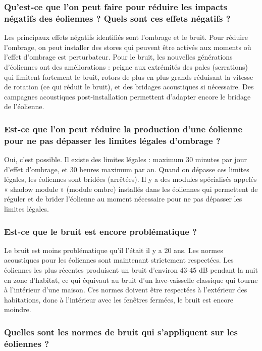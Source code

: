 \subsubsection{Qu'est-ce que l'on peut faire pour réduire les impacts négatifs des éoliennes ? Quels sont ces effets négatifs ?}

Les principaux effets négatifs identifiés sont l'ombrage et le bruit. Pour réduire l'ombrage, on peut installer des stores qui peuvent être activés aux moments où l'effet d'ombrage est perturbateur. Pour le bruit, les nouvelles générations d'éoliennes ont des améliorations : peigne aux extrémités des pales (serrations) qui limitent fortement le bruit, rotors de plus en plus grands réduisant la vitesse de rotation (ce qui réduit le bruit), et des bridages acoustiques si nécessaire. Des campagnes acoustiques post-installation permettent d'adapter encore le bridage de l'éolienne.

\subsubsection{Est-ce que l'on peut réduire la production d'une éolienne pour ne pas dépasser les limites légales d'ombrage ?}

Oui, c'est possible. Il existe des limites légales : maximum 30 minutes par jour d'effet d'ombrage, et 30 heures maximum par an. Quand on dépasse ces limites légales, les éoliennes sont bridées (arrêtées). Il y a des modules spécialisés appelés « shadow module » (module ombre) installés dans les éoliennes qui permettent de réguler et de brider l'éolienne au moment nécessaire pour ne pas dépasser les limites légales.

\subsubsection{Est-ce que le bruit est encore problématique ?}

Le bruit est moins problématique qu'il l'était il y a 20 ans. Les normes acoustiques pour les éoliennes sont maintenant strictement respectées. Les éoliennes les plus récentes produisent un bruit d'environ 43-45 dB pendant la nuit en zone d'habitat, ce qui équivaut au bruit d'un lave-vaisselle classique qui tourne à l'intérieur d'une maison. Ces normes doivent être respectées à l'extérieur des habitations, donc à l'intérieur avec les fenêtres fermées, le bruit est encore moindre.

\subsubsection{Quelles sont les normes de bruit qui s'appliquent sur les éoliennes ?}

